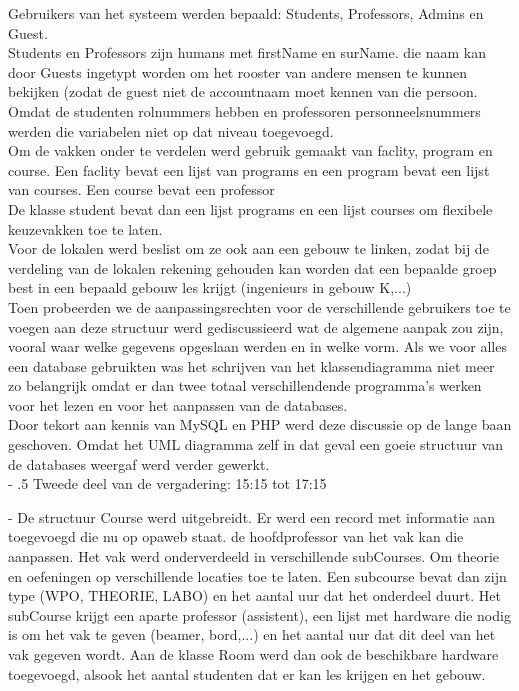 \documentclass{article}
\makeatletter
\renewcommand\paragraph{%
   \@startsection{paragraph}{4}{0mm}%
      {-\baselineskip}%
      {.5\baselineskip}%
      {\normalfont\normalsize\bfseries}}
\makeatother
\begin{document}
Gebruikers van het systeem werden bepaald: Students, Professors, Admins en Guest. \\
Students en Professors zijn humans met firstName en surName. die naam kan door Guests ingetypt worden om het rooster van andere mensen te kunnen bekijken (zodat de guest niet de accountnaam moet kennen van die persoon. \\
Omdat de studenten rolnummers hebben en professoren personneelsnummers werden die variabelen niet op dat niveau toegevoegd. \\
Om de vakken onder te verdelen werd gebruik gemaakt van faclity, program en course. Een faclity bevat een lijst van programs en een program bevat een lijst van courses. Een course bevat een professor \\
De klasse student bevat dan een lijst programs en een lijst courses om flexibele keuzevakken toe te laten. \\
Voor de lokalen werd beslist om ze ook aan een gebouw te linken, zodat bij de verdeling van de lokalen rekening gehouden kan worden dat een bepaalde groep best in een bepaald gebouw les krijgt (ingenieurs in gebouw K,...) \\[3mm]

Toen probeerden we de aanpassingsrechten voor de verschillende gebruikers toe te voegen aan deze structuur werd gediscussieerd wat de algemene aanpak zou zijn, vooral waar welke gegevens opgeslaan werden en in welke vorm. Als we voor alles een database gebruikten was het schrijven van het klassendiagramma niet meer zo belangrijk omdat er dan twee totaal verschillendende programma's werken voor het lezen en voor het aanpassen van de databases. \\
Door tekort aan kennis van MySQL en PHP werd deze discussie op de lange baan geschoven. Omdat het UML diagramma zelf in dat geval een goeie structuur van de databases weergaf werd verder gewerkt. \\

\paragraph{Tweede deel van de vergadering: 15:15 tot 17:15}

- De structuur Course werd uitgebreidt. Er werd een record met informatie aan toegevoegd die nu op opaweb staat. de hoofdprofessor van het vak kan die aanpassen. Het vak werd onderverdeeld in verschillende subCourses. Om theorie en oefeningen op verschillende locaties toe te laten. Een subcourse bevat dan zijn type (WPO, THEORIE, LABO) en het aantal uur dat het onderdeel duurt. Het subCourse krijgt een aparte professor (assistent), een lijst met hardware die nodig is om het vak te geven (beamer, bord,...) en het aantal uur dat dit deel van het vak gegeven wordt.
Aan de klasse Room werd dan ook de beschikbare hardware toegevoegd, alsook het aantal studenten dat er kan les krijgen en het gebouw.
\end{document}
